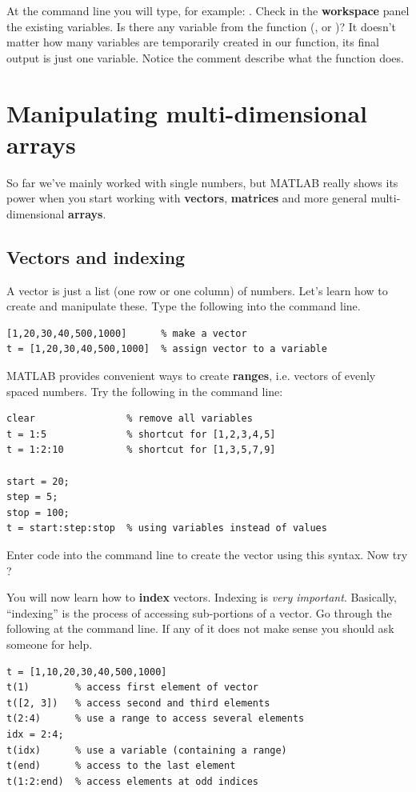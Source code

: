 \documentclass{article}
\begin{document}
At the command line you will type, for example: .
Check in the \textbf{workspace} panel the existing variables.
Is there any variable from the function (,  or )?
It doesn't matter how many variables are temporarily created in our function, its final output is just one variable.
Notice the comment describe what the function does. 

\section{Manipulating multi-dimensional arrays}

So far we've mainly worked with single numbers, but MATLAB really shows its power when you start 
working with \textbf{vectors}, \textbf{matrices} and more general multi-dimensional \textbf{arrays}.


\subsection{Vectors and indexing}

A vector is just a list (one row or one column) of numbers.
Let's learn how to create and manipulate these.
Type the following into the command line.
\begin{lstlisting}
[1,20,30,40,500,1000]      % make a vector
t = [1,20,30,40,500,1000]  % assign vector to a variable
\end{lstlisting}

MATLAB provides convenient ways to create \textbf{ranges}, i.e. vectors of evenly spaced numbers.
Try the following in the command line:
\begin{lstlisting}
clear                % remove all variables
t = 1:5              % shortcut for [1,2,3,4,5]
t = 1:2:10           % shortcut for [1,3,5,7,9]

start = 20;
step = 5;
stop = 100;
t = start:step:stop  % using variables instead of values
\end{lstlisting}
Enter code into the command line to create the vector \mcode{[5,8,11,14]} using this syntax. 
Now try \mcode{[-1,-2,-3,-4]}?

You will now learn how to \textbf{index} vectors.
Indexing is \emph{very important}.
Basically, ``indexing'' is the process of accessing sub-portions of a vector.
Go through the following at the command line.
If any of it does not make sense you should ask someone for help.
\begin{lstlisting}
t = [1,10,20,30,40,500,1000]
t(1)        % access first element of vector
t([2, 3])   % access second and third elements
t(2:4)      % use a range to access several elements
idx = 2:4;
t(idx)      % use a variable (containing a range)
t(end)      % access to the last element
t(1:2:end)  % access elements at odd indices
\end{lstlisting}
\end{document}

